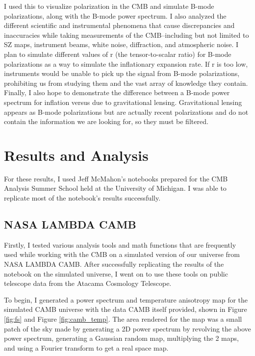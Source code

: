 \documentclass[12pt]{article}
\begin{document}
I used this to visualize polarization in the CMB and simulate B-mode polarizations, along with the B-mode power spectrum. I also analyzed the different scientific and instrumental phenomena that cause discrepancies and inaccuracies while taking measurements of the CMB–including but not limited to SZ maps, instrument beams, white noise, diffraction, and atmospheric noise. I plan to simulate different values of r (the tensor-to-scalar ratio) for B-mode polarizations as a way to simulate the inflationary expansion rate. If r is too low, instruments would be unable to pick up the signal from B-mode polarizations, prohibiting us from studying them and the vast array of knowledge they contain. Finally, I also hope to demonstrate the difference between a B-mode power spectrum for inflation versus due to gravitational lensing. Gravitational lensing appears as B-mode polarizations but are actually recent polarizations and do not contain the information we are looking for, so they must be filtered.

\section{Results and Analysis}
For these results, I used Jeff McMahon’s notebooks prepared for the CMB Analysis Summer School held at the University of Michigan. I was able to replicate most of the notebook’s results successfully.

\subsection{NASA LAMBDA CAMB}
Firstly, I tested various analysis tools and math functions that are frequently used while working with the CMB on a simulated version of our universe from NASA LAMBDA CAMB. After successfully replicating the results of the notebook on the simulated universe, I went on to use these tools on public telescope data from the Atacama Cosmology Telescope. 

To begin, I generated a power spectrum and temperature anisotropy map for the simulated CAMB universe with the data CAMB itself provided, shown in Figure \ref{fig:fs} and Figure \ref{fig:camb_temp}. The area rendered for the map was a small patch of the sky made by generating a 2D power spectrum by revolving the above power spectrum, generating a Gaussian random map, multiplying the 2 maps, and using a Fourier transform to get a real space map.
\end{document}
